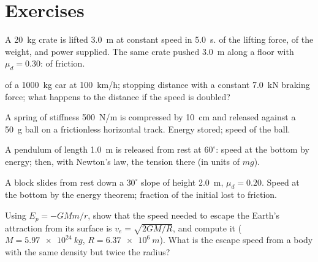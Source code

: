 \section{Exercises}

\begin{exercise}[$\star$]\label{exo:b1:work-and-energy:1}
A \qty{20}{kg} crate is lifted \qty{3.0}{m} at constant speed in
\qty{5.0}{s}.  of the lifting force, of the weight, and power
supplied. The same crate pushed \qty{3.0}{m} along a floor with
$\mu_d = 0.30$:  of friction.
\end{exercise}

\begin{exercise}[$\star$]\label{exo:b1:work-and-energy:2}
 of a \qty{1000}{kg} car at \qty{100}{km/h}; stopping
distance with a constant \qty{7.0}{kN} braking force; what happens to
the distance if the speed is doubled?
\end{exercise}

\begin{exercise}[$\star$]\label{exo:b1:work-and-energy:3}
A spring of stiffness \qty{500}{N/m} is compressed by \qty{10}{cm} and
released against a \qty{50}{g} ball on a frictionless horizontal track.
Energy stored; speed of the ball.
\end{exercise}

\begin{exercise}[$\star$]\label{exo:b1:work-and-energy:4}
A pendulum of length \qty{1.0}{m} is released from rest at $60^\circ$:
speed at the bottom by energy; then, with Newton's law, the tension
there (in units of $mg$).
\end{exercise}

\begin{exercise}[$\star\star$]\label{exo:b1:work-and-energy:5}
A block slides from rest down a $30^\circ$ slope of height \qty{2.0}{m},
$\mu_d = 0.20$. Speed at the bottom by the energy theorem; fraction of
the initial  lost to friction.
\end{exercise}

\begin{exercise}[$\star\star$]\label{exo:b1:work-and-energy:6}
Using $E_p = -GMm/r$, show that the speed needed to escape the Earth's
attraction from its surface is $v_e = \sqrt{2GM/R}$, and compute it
($M = \qty{5.97e24}{kg}$, $R = \qty{6.37e6}{m}$). What is the escape
speed from a body with the same density but twice the radius?
\end{exercise}


